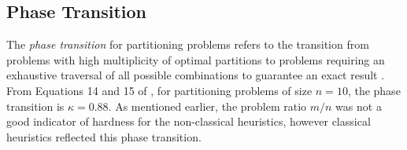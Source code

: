 \subsection{Phase Transition}
The \emph{phase transition} for partitioning problems refers to the transition from problems with high multiplicity of optimal partitions to problems requiring an exhaustive traversal of all possible combinations to guarantee an exact result \cite{hayes2002computing,mertens1998phase}. From Equations 14 and 15 of \cite{mertens1998phase}, for partitioning problems of size $n=10$, the phase transition is $\kappa = 0.88$. As mentioned earlier, the problem ratio $m/n$ was not a good indicator of hardness for the non-classical heuristics, however classical heuristics reflected this phase transition.